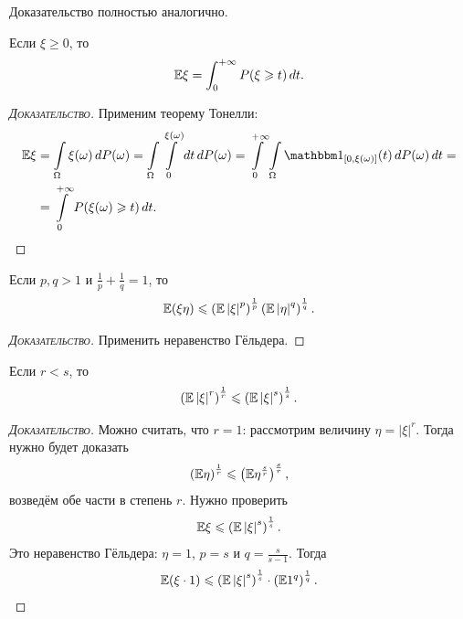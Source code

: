 Доказательство полностью аналогично.

\begin{prop}
 Если $ \xi \geqslant 0 $, то
 \begin{align*}
  \mathbb E\xi = \int_{0}^{+\infty} P(\xi \geqslant t)\,dt.
 \end{align*} 
\end{prop}
\begin{proof}[\normalfont\textsc{Доказательство}]
 Применим теорему Тонелли:
 \begin{align*}
  \E\xi &= \int\limits_{\Omega} \xi(\omega)\,dP(\omega) = \int\limits_{\Omega} \int\limits_{0}^{\xi(\omega)} dt\,dP(\omega) = \int\limits_{0}^{+\infty} \int\limits_{\Omega}   \Ind_{[0, \xi(\omega)]}(t)\,dP(\omega)\,dt = \\
  &= \int\limits_{0}^{+\infty} P(\xi(\omega) \geqslant t)\,dt.
 \end{align*} 
\end{proof}

\begin{prop}
 Если $ p, q > 1 $ и $ \frac{1}{p}+\frac{1}{q} = 1 $, то
 \begin{align*}
  \mathbb E(\xi\eta) \leqslant \left( \mathbb E \left| \xi \right|^{p} \right)^{\frac{1}{p}} \left( \mathbb E \left| \eta \right|^{q} \right)^{\frac{1}{q}}.
 \end{align*} 
\end{prop}
\begin{proof}[\normalfont\textsc{Доказательство}]
 Применить неравенство Гёльдера.
\end{proof}

\begin{prop}
 \label{proposition:Lyapunov_inequality}
 Если $ r < s $, то 
 \begin{align*}
  \left(\mathbb E \left| \xi \right|^{r} \right)^{\frac{1}{r}} \leqslant \left( \mathbb E \left| \xi \right|^{s} \right)^{\frac{1}{s}}.
 \end{align*} 
\end{prop}
\begin{proof}[\normalfont\textsc{Доказательство}]
 Можно считать, что $ r = 1 $: рассмотрим величину $ \eta = \left| \xi \right|^{r} $. Тогда нужно будет доказать
 \begin{align*}
  \left( \mathbb E \eta \right)^{\frac{1}{r}} \leqslant \left( \mathbb E\eta^{\frac{s}{r}} \right)^{\frac{s}{r}},
 \end{align*} возведём обе части в степень $ r $.
 Нужно проверить
 \begin{align*}
  \mathbb E\xi \leqslant \left( \mathbb E \left| \xi \right|^{s} \right)^{\frac{1}{s}}.
 \end{align*} Это неравенство Гёльдера: $ \eta = 1 $, $ p = s $ и $ q= \frac{s}{s-1} $. Тогда
 \begin{align*}
  \mathbb E(\xi \cdot 1) \leqslant \left( \mathbb E \left| \xi \right|^{s} \right)^{\frac{1}{s}} \cdot \left( \mathbb E 1^{q} \right)^{\frac{1}{q}}.
 \end{align*} 
\end{proof}

